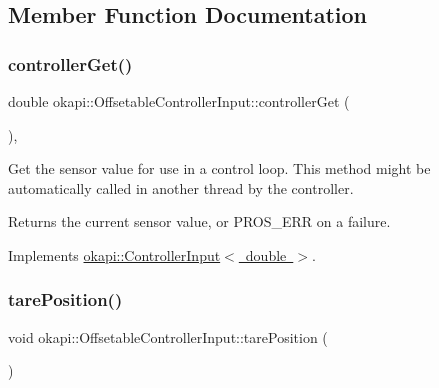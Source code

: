 \subsection{Member Function Documentation}
\mbox{\label{classokapi_1_1OffsetableControllerInput_af51f93ac176113930ed07ee7b2b9b269}} 
\subsubsection{\texorpdfstring{controllerGet()}{controllerGet()}}
{\footnotesize\ttfamily double okapi\+::\+Offsetable\+Controller\+Input\+::controller\+Get (\begin{DoxyParamCaption}{ }\end{DoxyParamCaption})\hspace{0.3cm}{\ttfamily [override]}, {\ttfamily [virtual]}}

Get the sensor value for use in a control loop. This method might be automatically called in another thread by the controller.

\begin{DoxyReturn}{Returns}
the current sensor value, or P\+R\+O\+S\+\_\+\+E\+RR on a failure. 
\end{DoxyReturn}


Implements \mbox{\hyperlink{classokapi_1_1ControllerInput_a3c6c86d897983f367928a93890551e17}{okapi\+::\+Controller\+Input$<$ double $>$}}.

\mbox{\label{classokapi_1_1OffsetableControllerInput_ad55cc6173276690cd2f0d774a2c40731}} 
\subsubsection{\texorpdfstring{tarePosition()}{tarePosition()}}
{\footnotesize\ttfamily void okapi\+::\+Offsetable\+Controller\+Input\+::tare\+Position (\begin{DoxyParamCaption}{ }\end{DoxyParamCaption})\hspace{0.3cm}{\ttfamily [virtual]}}

